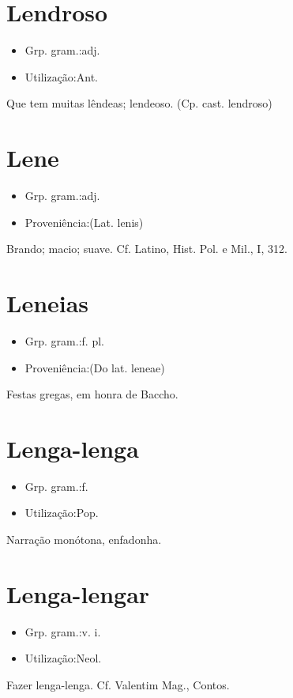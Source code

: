 \section{Lendroso}
\begin{itemize}
\item {Grp. gram.:adj.}
\end{itemize}
\begin{itemize}
\item {Utilização:Ant.}
\end{itemize}
Que tem muitas lêndeas; lendeoso.
(Cp. cast. \textunderscore lendroso\textunderscore )
\section{Lene}
\begin{itemize}
\item {Grp. gram.:adj.}
\end{itemize}
\begin{itemize}
\item {Proveniência:(Lat. \textunderscore lenis\textunderscore )}
\end{itemize}
Brando; macio; suave. Cf. Latino, \textunderscore Hist. Pol. e Mil.\textunderscore , I, 312.
\section{Leneias}
\begin{itemize}
\item {Grp. gram.:f. pl.}
\end{itemize}
\begin{itemize}
\item {Proveniência:(Do lat. \textunderscore leneae\textunderscore )}
\end{itemize}
Festas gregas, em honra de Baccho.
\section{Lenga-lenga}
\begin{itemize}
\item {Grp. gram.:f.}
\end{itemize}
\begin{itemize}
\item {Utilização:Pop.}
\end{itemize}
Narração monótona, enfadonha.
\section{Lenga-lengar}
\begin{itemize}
\item {Grp. gram.:v. i.}
\end{itemize}
\begin{itemize}
\item {Utilização:Neol.}
\end{itemize}
Fazer lenga-lenga. Cf. Valentim Mag., \textunderscore Contos\textunderscore .
